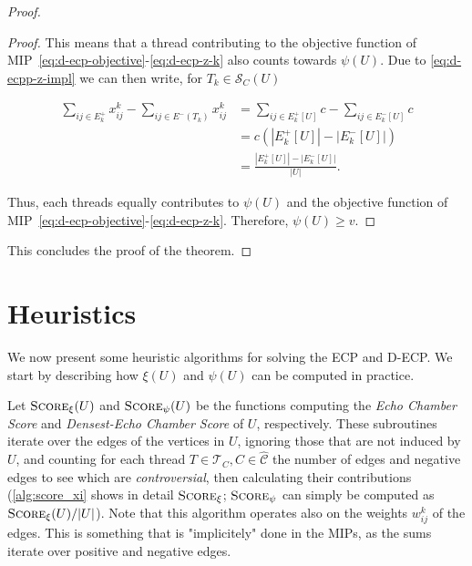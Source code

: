 \begin{proof}
\begin{proof}
		This means that a thread contributing to the objective function of
		MIP~\eqref{eq:d-ecp-objective}-\eqref{eq:d-ecp-z-k} also counts towards
		$\psi(U)$. Due to \eqref{eq:d-ecpp-z-impl} we can then write, for
		$T_k \in \mathcal{S}_C(U)$

		\begin{align*}
			\sum^{}_{ij \in E^+_k} x_{ij} ^{k} - \sum_{ij \in E^{-}
			(T_{k})} x_{ij} ^{k} & = \sum^{}_{ij \in E^{+}_k[U] } c - \sum_{ij \in E^{-}
			_k[U]} c                                                                     \\
			                     & = c (|E^{+}_{k}[U]| - |E^{-}_{k}[U]|)                 \\
			                     & = \frac{|E^{+}_{k}[U]| -
			|E^{-}_{k}[U]|}{|U|}.
		\end{align*}

		Thus, each threads equally contributes to $\psi(U)$ and the objective
		function of MIP~\eqref{eq:d-ecp-objective}-\eqref{eq:d-ecp-z-k}.
		Therefore, $\psi(U) \geq v$.
	\end{proof}

	This concludes the proof of the theorem.

\end{proof}

\section{Heuristics}%
\label{sub:approximation_algorithms}

We now present some heuristic algorithms for solving the \acrshort{ECP} and
\acrshort{D-ECP}. We start by describing how $\xi(U)$ and $\psi(U)$ can be
computed in practice.

Let $\textsc{Score}_{\xi} (U)$ and $\textsc{Score}_{\psi} (U)$ be the functions
computing the \emph{Echo Chamber Score} and \emph{Densest-Echo Chamber Score}
of $U$, respectively. These subroutines iterate over the edges of the vertices
in $U$, ignoring those that are not induced by $U$, and counting for each
thread $T \in \mathcal{T}_{C}, C \in \mathcal{\hat{C}} $ the number of edges
and negative edges to see which are \emph{controversial}, then calculating
their contributions (\autoref{alg:score_xi} shows in detail
$\textsc{Score}_\xi$; $\textsc{Score}_\psi$ can simply be computed as
$\textsc{Score}_\xi(U)/|U|$).  Note that this algorithm operates also on the
weights $w_{ij}^{k}$ of the edges. This is something that is "implicitely" done
in the \acrshort{MIP}s, as the sums iterate over positive and negative edges.

